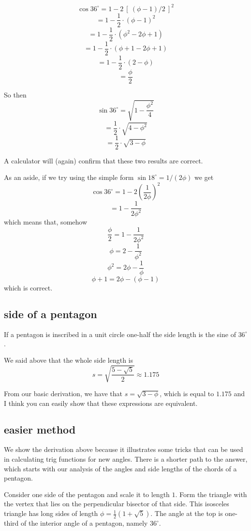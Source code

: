 \documentclass[11pt, oneside]{article}
\begin{document}
\[ \cos 36^{\circ} = 1 - 2 \ [ \ (\phi - 1)/2 \ ]^2 \]
\[ = 1 - \frac{1}{2} \cdot (\phi - 1)^2 \]
\[ = 1 - \frac{1}{2} \cdot (\phi^2 - 2 \phi + 1) \]
\[ = 1 - \frac{1}{2} \cdot (\phi + 1 - 2 \phi + 1) \]
\[ = 1 - \frac{1}{2} \cdot (2 - \phi) \]
\[ = \frac{\phi}{2} \]

So then
\[ \sin 36^{\circ} = \sqrt{1 - \frac{\phi^2}{4}} \]
\[ = \frac{1}{2} \cdot \sqrt{4 - \phi^2} \]
\[ = \frac{1}{2} \cdot \sqrt{3 - \phi} \]

A calculator will (again) confirm that these two results are correct.

As an aside, if we try using the simple form $\sin 18^{\circ} =  1/(2 \phi)$ we get
\[ \cos 36^{\circ} = 1 - 2 (\frac{1}{2 \phi})^2 \]
\[ = 1 - \frac{1}{2 \phi^2} \]
which means that, somehow
\[ \frac{\phi}{2} = 1 - \frac{1}{2 \phi^2} \]
\[ \phi = 2 - \frac{1}{\phi^2} \]
\[ \phi^2 = 2 \phi - \frac{1}{\phi} \]
\[ \phi + 1 = 2 \phi - (\phi - 1) \]
which is correct.

\subsection*{side of a pentagon}

If a pentagon is inscribed in a unit circle one-half the side length is the sine of $36^{\circ}$.

We said above that the whole side length is 
\[ s = \sqrt{\frac{5 - \sqrt{5}}{2}} \approx 1.175 \]

From our basic derivation, we have that $s = \sqrt{3 - \phi}$, which is equal to $1.175$ and I think you can easily show that these expressions are equivalent.

\subsection*{easier method}

We show the derivation above because it illustrates some tricks that can be used in calculating trig functions for new angles.  There is a shorter path to the answer, which starts with our analysis of the angles and side lengths of the chords of a pentagon.

Consider one side of the pentagon and scale it to length $1$.  Form the triangle with the vertex that lies on the perpendicular bisector of that side.  This isosceles triangle has long sides of length $\phi = \frac{1}{2} (1 + \sqrt{5})$.  The angle at the top is one-third of the interior angle of a pentagon, namely $36^{\circ}$.
\end{document}
